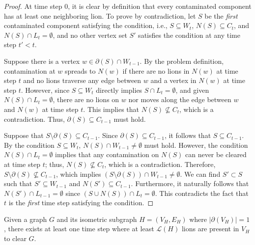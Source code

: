 \documentclass[a4paper,UKenglish,cleveref, autoref, thm-restate]{lipics-v2021}
\begin{document}
\begin{proof}
At time step $0$, it is clear by definition that every contaminated component has at least one neighboring lion. To prove by contradiction, let $S$ be the \emph{first} contaminated component satisfying the condition, i.e., $S \subseteq W_t$, $N(S)\subseteq C_t$, and $N(S)\cap L_t=\emptyset$, and no other vertex set $S'$ satisfies the condition at any time step $t'<t$.

Suppose there is a vertex $w\in \partial(S)\cap W_{t-1}$. By the problem definition, contamination at $w$ spreads to $N(w)$ if there are no lions in $N(w)$ at time step $t$ and no lions traverse any edge between $w$ and a vertex in $N(w)$ at time step $t$. However, since $S \subseteq W_t$ directly implies $S\cap L_t=\emptyset$, and given $N(S)\cap L_t=\emptyset$, there are no lions on $w$ nor moves along the edge between $w$ and $N(w)$ at time step $t$. This implies that $N(S)\nsubseteq C_t$, which is a contradiction. Thus, $\partial(S)\subseteq C_{t-1}$ must hold.

Suppose that $S\setminus \partial(S)\subseteq C_{t-1}$. Since $\partial(S)\subseteq C_{t-1}$, it follows that $S \subseteq C_{t-1}$. By the condition $S\subseteq W_t$, $N(S)\cap W_{t-1}\neq \emptyset$ must hold. However, the condition $N(S)\cap L_t=\emptyset$ implies that any contamination on $N(S)$ can never be cleared at time step $t$; thus, $N(S)\nsubseteq C_{t}$, which is a contradiction. Therefore, $S\setminus \partial(S)\nsubseteq C_{t-1}$, which implies $(S\setminus \partial(S))\cap W_{t-1}\neq \emptyset$. We can find $S'\subset S$ such that $S'\subseteq W_{t-1}$ and $N(S')\subseteq C_{t-1}$. Furthermore, it naturally follows that $N(S')\cap L_{t-1}= \emptyset$ since $(S\cup N(S))\cap L_t=\emptyset$. This contradicts the fact that $t$ is the \emph{first} time step satisfying the condition.
\end{proof}

\begin{lemma}\label{lemma:subtree_on-graph_lion_lemma}
Given a graph $G$ and its isometric subgraph $H=(V_H, E_H)$ where $|\partial(V_H)|=1$, there exists at least one time step where at least $\mathcal{L}(H)$ lions are present in $V_H$ to clear $G$.
\end{lemma}
\end{document}
